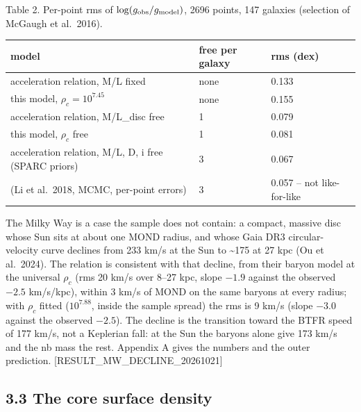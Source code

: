 \documentclass[
  10pt,
]{article}
\begin{document}
Table 2. Per-point rms of $\log(g_{\rm obs}/g_{\rm model})$, 2696 points, 147 galaxies (selection of McGaugh et al.~2016).

\begin{longtable}[]{@{}lll@{}}
\toprule
model & free per galaxy & rms (dex)\tabularnewline
\midrule
\endhead
acceleration relation, M/L fixed & none & 0.133\tabularnewline
this model, $\rho_c=10^{7.45}$ & none & 0.155\tabularnewline
acceleration relation, M/L\_disc free & 1 & 0.079\tabularnewline
this model, $\rho_c$ free & 1 & 0.081\tabularnewline
acceleration relation, M/L, D, i free (SPARC priors) & 3 &
0.067\tabularnewline
(Li et al.~2018, MCMC, per-point errors) & 3 & 0.057 -- not
like-for-like\tabularnewline
\bottomrule
\end{longtable}

The Milky Way is a case the sample does not contain: a compact, massive disc whose Sun sits at about one MOND radius, and whose Gaia DR3 circular-velocity curve declines from 233 km/s at the Sun to \textasciitilde{}175 at 27 kpc (Ou et al.~2024). The relation is consistent with that decline, from their baryon model at the universal $\rho_c$ (rms 20 km/s over 8--27 kpc, slope $-1.9$ against the observed $-2.5$ km/s/kpc), within 3 km/s of MOND on the same baryons at every radius; with $\rho_c$ fitted ($10^{7.88}$, inside the sample spread) the rms is 9 km/s (slope $-3.0$ against the observed $-2.5$). The decline is the transition toward the BTFR speed of 177 km/s, not a Keplerian fall: at the Sun the baryons alone give 173 km/s and the nb mass the rest. Appendix A gives the numbers and the outer prediction. {[}RESULT\_MW\_DECLINE\_20261021{]}

\subsection{3.3 The core surface density}\label{the-core-surface-density}
\end{document}
